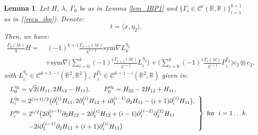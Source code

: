 \documentclass[reqno,twoside,11pt]{amsart}
\newcommand{\sym}{\mathrm{sym}}
\newcommand{\R}{\mathbb{R}}
\numberwithin{equation}{section}
\theoremstyle{plain}
\newtheorem{lemma}[theorem]{Lemma}
\theoremstyle{definition}
\begin{document}
\begin{lemma}\label{lem_IBP2}
Let $H$, $\lambda$, $\Gamma_0$ be as in Lemma \ref{lem_IBP1} and
$\{\Gamma_i\in \mathcal{C}^{i}(\R,\R)\}_{i=1}^{k+1}$ as in (\ref{recu_ibp}).
Denote:
$$t=\langle x, \eta_2\rangle.$$
Then, we have:
\begin{equation}\label{ibp2}
\begin{split}
\frac{\Gamma_0(\lambda t)}{\lambda}H = & \; (-1)^{k+1}\frac{\Gamma_{k+1}(\lambda
  t)}{\lambda^{k+2}} \sym\nabla L_k^{\eta_2}  \\ & + \sym\nabla
\Big(\sum_{i=0}^k(-1)^i\frac{\Gamma_{i+1}(\lambda
  t)}{\lambda^{i+2}} L_i^{\eta_2}\Big) 
+ \Big( \sum_{i=0}^{k}(-1)^i\frac{\Gamma_i(\lambda t)}{\lambda^{i+1}} P_i^{\eta_2}\Big) e_2\otimes e_2,
\end{split}
\end{equation}
with $L_i^{\eta_2}\in\mathcal{C}^{k+1-i}(\R^2,\R^2)$,
$P_i^{\eta_2}\in\mathcal{C}^{k+1-i}(\R^2,\R)$ given in:
\begin{equation}\label{coef_ibp2}
\begin{split}
& \;\; \; L_0^{\eta_2} = \sqrt{2}(H_{11}, 2H_{12}-H_{11}), \qquad P_0^{\eta_2} = H_{22}-2H_{12}+H_{11},\\
& \left.\begin{array}{l} L_i^{\eta_2}= 2^{(i+1)/2}\big(\partial_1^{(i)}H_{11}, 
2\partial_1^{(i)}H_{12} + i \partial_1^{(i-1)}\partial_2H_{11}- (i+1)\partial_i^{(i)}H_{11}\big), \vspace{2mm} 
\\  P_i^{\eta_2} = {2}^{i/2}\big(2\partial_1^{(i-1)}\partial_2H_{12}-2\partial_1^{(i)}H_{12} +
(i-1)\partial_1^{(i-2)}\partial_2^{(2)}H_{11}\vspace{2mm} 
\\ \quad\qquad -2i\partial_1^{(i-1)}\partial_2H_{11}+
(i+1)\partial_i^{(i)}H_{11} \big) \end{array}\right\}
\mbox{ for }\; i=1\ldots k.
\end{split}
\end{equation}
\end{lemma}
\end{document}
